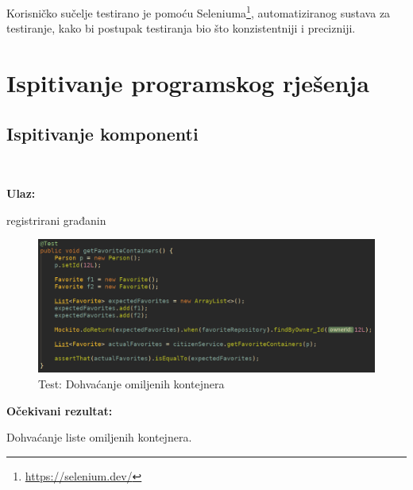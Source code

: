 				Korisničko sučelje testirano je pomoću Seleniuma\footnote{\url{https://selenium.dev/}}, automatiziranog sustava za testiranje, kako bi postupak testiranja bio što konzistentniji i precizniji.
			
 			
			\eject 
			
		\section{Ispitivanje programskog rješenja}
			
			\subsection{Ispitivanje komponenti}
		
				
			
			\noindent {}
			
			\
			
			\noindent \textbf{Ulaz:}
			
			\begin{packed_enum}
				\item registrirani građanin
					
				
			\end{packed_enum}

			\begin{figure}[H]
					\includegraphics[scale=0.57]{figures/Screenshot_20200115_223752.PNG}
					\centering
					\caption{Test: Dohvaćanje omiljenih kontejnera}
					\label{fig:Dohvaćanje omiljenih kontejnera}
				\end{figure}	
			
			\noindent \textbf{Očekivani rezultat:}
				\begin{packed_enum}
				\item Dohvaćanje liste omiljenih kontejnera.
							
				
			\end{packed_enum}
			
